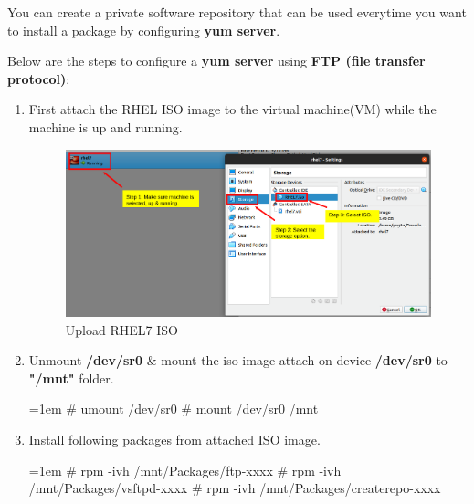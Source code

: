 \setlength{\columnsep}{3pt}
\begin{flushleft}
	\bigskip
	You can create a private software repository that can be used everytime you want to install a package by configuring \textbf{yum server}.
	
	Below are the steps to configure a \textbf{yum server} using \textbf{FTP (file transfer protocol)}:
	
	\begin{enumerate}
		\item First attach the RHEL ISO image to the virtual machine(VM) while the machine is up and running.
		
		\begin{figure}[h!]
			\centering
			\includegraphics[scale=.3]{content/chapter11/images/ISO.png}
			\caption{Upload RHEL7 ISO}
			\label{fig:iso}
		\end{figure}	
		
		\item Unmount \textbf{/dev/sr0} \& mount the iso image attach on device \textbf{/dev/sr0} to \textbf{"/mnt"} folder.
		\begin{tcolorbox}[breakable,notitle,boxrule=-0pt,colback=black,colframe=black]
			\color{green}
			\font=1em
			\# umount	/dev/sr0
			\newline
			\# mount	/dev/sr0	/mnt
			\font=4pt
		\end{tcolorbox}

		\item Install following packages from attached ISO image.
		\begin{tcolorbox}[breakable,notitle,boxrule=-0pt,colback=black,colframe=black]
			\color{green}
			\font=1em
			\# rpm	-ivh	/mnt/Packages/ftp-xxxx
			\newline
			\# rpm	-ivh 	/mnt/Packages/vsftpd-xxxx
			\newline
			\# rpm	-ivh	/mnt/Packages/createrepo-xxxx
			\font=4pt
		\end{tcolorbox}
		

\end{enumerate}
\end{flushleft}

